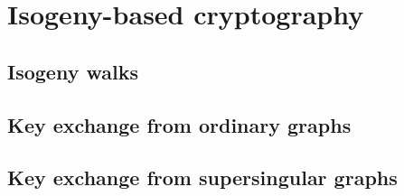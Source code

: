 \documentclass{beamer}
\begin{document}

\section{Isogeny-based cryptography}
\subsection{Isogeny walks}


\subsection{Key exchange from ordinary graphs}


\subsection{Key exchange from supersingular graphs}

  


  


  


  


  


  

\end{document}
